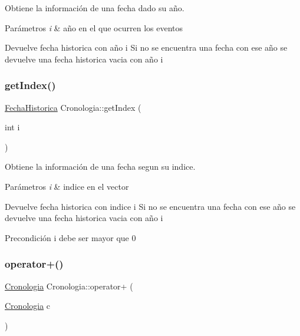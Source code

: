Obtiene la información de una fecha dado su año. 


\begin{DoxyParams}{Parámetros}
{\em i} & año en el que ocurren los eventos \\
\hline
\end{DoxyParams}
\begin{DoxyReturn}{Devuelve}
fecha historica con año {\ttfamily i} Si no se encuentra una fecha con ese año se devuelve una fecha historica vacia con año i 
\end{DoxyReturn}
\mbox{\label{classCronologia_aaf114dc1d15b4c0032a782a0d8cb2c8c}} 
\subsubsection{\texorpdfstring{get\+Index()}{getIndex()}}
{\footnotesize\ttfamily \hyperlink{classFechaHistorica}{Fecha\+Historica} Cronologia\+::get\+Index (\begin{DoxyParamCaption}\item[{int}]{i }\end{DoxyParamCaption})}



Obtiene la información de una fecha segun su indice. 


\begin{DoxyParams}{Parámetros}
{\em i} & indice en el vector \\
\hline
\end{DoxyParams}
\begin{DoxyReturn}{Devuelve}
fecha historica con indice {\ttfamily i} Si no se encuentra una fecha con ese año se devuelve una fecha historica vacia con año i 
\end{DoxyReturn}
\begin{DoxyPrecond}{Precondición}
i debe ser mayor que 0 
\end{DoxyPrecond}
\mbox{\label{classCronologia_a1011faa8363ae7a196301f7693151fad}} 
\subsubsection{\texorpdfstring{operator+()}{operator+()}}
{\footnotesize\ttfamily \hyperlink{classCronologia}{Cronologia} Cronologia\+::operator+ (\begin{DoxyParamCaption}\item[{\hyperlink{classCronologia}{Cronologia}}]{c }\end{DoxyParamCaption})}



